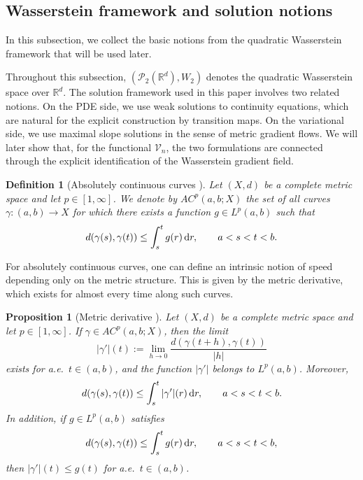 \documentclass[11pt,reqno]{amsart}
\numberwithin{figure}{section}
\def\d {{\partial}}
\def\d{\mathrm{d}}
\renewcommand{\d}{  {\textup{d}} }
\newtheorem{proposition}{Proposition}[section]
\newtheorem{definition}{Definition}[section]
\begin{document}
 








\subsection{Wasserstein framework and solution notions} \label{sec:2.3}

In this subsection, we collect the basic notions from the quadratic Wasserstein framework that will be used later. 

Throughout this subsection, $(\mathcal P_2(\mathbb R^d),W_2)$ denotes the quadratic Wasserstein space over $\mathbb R^d$. The solution framework used in this paper involves two related notions. On the PDE side, we use weak solutions to continuity equations, which are natural for the explicit construction by transition maps. On the variational side, we use maximal slope solutions in the sense of metric gradient flows. We will later
show that, for the functional $\mathcal V_n$, the two formulations are connected through the explicit identification of the Wasserstein gradient field.

\begin{definition}[Absolutely continuous curves {\cite[Definition~1.1.1]{AGS2005}}] 
Let $(X,d)$ be a complete metric space and let $p\in[1,\infty]$. We denote by $AC^p(a,b;X)$ the set of all curves $\gamma:(a,b)\to X$ for which there exists a function $g\in L^p(a,b)$ such that 
\[ d(\gamma(s),\gamma(t)) \le \int_s^t g(r)\,\d r, \qquad a<s<t<b. \] 
\end{definition} 

For absolutely continuous curves, one can define an intrinsic notion of speed
depending only on the metric structure. This is given by the metric derivative,
which exists for almost every time along such curves.


\begin{proposition}[Metric derivative {\cite[Theorem~1.1.2]{AGS2005}}]
	Let $(X,d)$ be a complete metric space and let $p\in[1,\infty]$. If
	$\gamma\in AC^p(a,b;X)$, then the limit
	\[
	|\gamma'|(t):=\lim_{h\to0}\frac{d(\gamma(t+h),\gamma(t))}{|h|}
	\]
	exists for a.e.\ $t\in(a,b)$, and the function $|\gamma'|$ belongs to
	$L^p(a,b)$. Moreover,
	\[
	d(\gamma(s),\gamma(t))
	\le
	\int_s^t |\gamma'|(r)\,\d r,
	\qquad a<s<t<b.
	\]
	In addition, if $g\in L^p(a,b)$ satisfies
	\[
	d(\gamma(s),\gamma(t))
	\le
	\int_s^t g(r)\,\d r,
	\qquad a<s<t<b,
	\]
	then $|\gamma'|(t)\le g(t)$ for a.e.\ $t\in(a,b)$.
\end{proposition}
\end{document}

